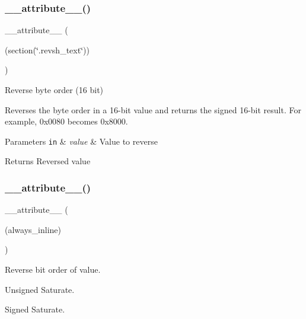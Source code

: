 \subsubsection{\texorpdfstring{\+\_\+\+\_\+attribute\+\_\+\+\_\+()}{\_\_attribute\_\_()}\hspace{0.1cm}{\footnotesize\ttfamily [2/3]}}
{\footnotesize\ttfamily \+\_\+\+\_\+attribute\+\_\+\+\_\+ (\begin{DoxyParamCaption}\item[{(section(\char`\"{}.revsh\+\_\+text\char`\"{}))}]{ }\end{DoxyParamCaption})}



Reverse byte order (16 bit) 

Reverses the byte order in a 16-\/bit value and returns the signed 16-\/bit result. For example, 0x0080 becomes 0x8000. 
\begin{DoxyParams}[1]{Parameters}
\mbox{\tt in}  & {\em value} & Value to reverse \\
\hline
\end{DoxyParams}
\begin{DoxyReturn}{Returns}
Reversed value 
\end{DoxyReturn}
\mbox{\label{group___c_m_s_i_s___core___instruction_interface_gab926fe7178a379c3a7c0410b06fcb661}} 
\subsubsection{\texorpdfstring{\+\_\+\+\_\+attribute\+\_\+\+\_\+()}{\_\_attribute\_\_()}\hspace{0.1cm}{\footnotesize\ttfamily [3/3]}}
{\footnotesize\ttfamily \+\_\+\+\_\+attribute\+\_\+\+\_\+ (\begin{DoxyParamCaption}\item[{(always\+\_\+inline)}]{ }\end{DoxyParamCaption})}



Reverse bit order of value. 

Unsigned Saturate.

Signed Saturate.

